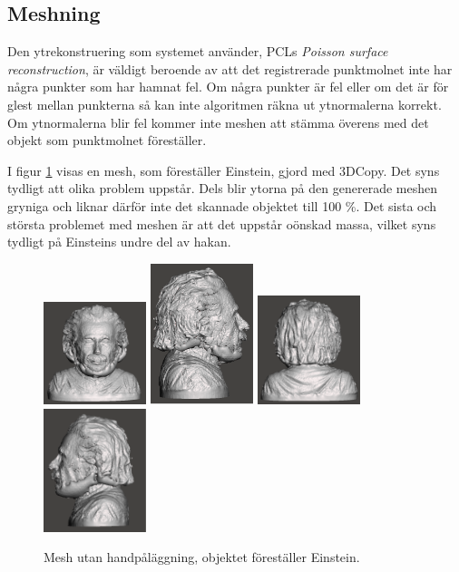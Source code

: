 \subsection{Meshning}
Den ytrekonstruering som systemet använder, PCLs \textit{Poisson surface reconstruction}, är väldigt beroende av att det registrerade punktmolnet inte har några punkter som har hamnat fel. Om några punkter är fel eller om det är för glest mellan punkterna så kan inte algoritmen räkna ut ytnormalerna korrekt. Om ytnormalerna blir fel kommer inte meshen att stämma överens med det objekt som punktmolnet föreställer.

I figur \ref{fig:einstein_mesh_without_imposition} visas en mesh, som föreställer Einstein, gjord med 3DCopy. Det syns tydligt att olika problem uppstår. Dels blir ytorna på den genererade meshen gryniga och liknar därför inte det skannade objektet till 100 \%. Det sista och största problemet med meshen är att det uppstår oönskad massa, vilket syns tydligt på Einsteins undre del av hakan.

\begin{figure}[H]
	\centering
	\includegraphics[width=30mm]{figures/ein_mesh_without_imposition1.png}
	\includegraphics[width=30mm]{figures/ein_mesh_without_imposition2.png}
	\includegraphics[width=30mm]{figures/ein_mesh_without_imposition3.png}
	\includegraphics[width=30mm]{figures/ein_mesh_without_imposition4.png}
	\caption{Mesh utan handpåläggning, objektet föreställer Einstein.}
	\label{fig:einstein_mesh_without_imposition}
\end{figure}

